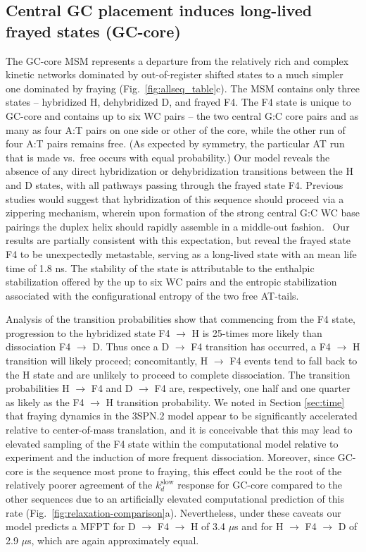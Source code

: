 \documentclass[journal=jpcbfk,manuscript=article]{achemso}
\begin{document}
\subsection{Central GC placement induces long-lived frayed states (GC-core)} \label{sec:GC-core}

The GC-core MSM represents a departure from the relatively rich and complex kinetic networks dominated by out-of-register shifted states to a much simpler one dominated by fraying (Fig.~\ref{fig:allseq_table}c). The MSM contains only three states -- hybridized H, dehybridized D, and frayed F4. The F4 state is unique to GC-core and contains up to six WC pairs -- the two central G:C core pairs and as many as four A:T pairs on one side or other of the core, while the other run of four A:T pairs remains free. (As expected by symmetry, the particular AT run that is made vs.\ free occurs with equal probability.) Our model reveals the absence of any direct hybridization or dehybridization transitions between the H and D states, with all pathways passing through the frayed state F4. Previous studies would suggest that hybridization of this sequence should proceed via a zippering mechanism, wherein upon formation of the strong central G:C WC base pairings the duplex helix should rapidly assemble in a middle-out fashion.~\citep{Romano2013DNADependence, Yin2011KineticsHybridization} Our results are partially consistent with this expectation, but reveal the frayed state F4 to be unexpectedly metastable, serving as a long-lived state with an mean life time of 1.8 ns. The stability of the state is attributable to the enthalpic stabilization offered by the up to six WC pairs and the entropic stabilization associated with the configurational entropy of the two free AT-tails.

Analysis of the transition probabilities show that commencing from the F4 state, progression to the hybridized state F4 $\rightarrow$ H is 25-times more likely than dissociation F4 $\rightarrow$ D. Thus once a D $\rightarrow$ F4 transition has occurred, a F4 $\rightarrow$ H transition will likely proceed; concomitantly, H $\rightarrow$ F4 events tend to fall back to the H state and are unlikely to proceed to complete dissociation. The transition probabilities H $\rightarrow$ F4 and D $\rightarrow$ F4 are, respectively, one half and one quarter as likely as the F4 $\rightarrow$ H transition probability. We noted in Section \ref{sec:time} that fraying dynamics in the 3SPN.2 model appear to be significantly accelerated relative to center-of-mass translation, and it is conceivable that this may lead to elevated sampling of the F4 state within the computational model relative to experiment and the induction of more frequent dissociation. Moreover, since GC-core is the sequence most prone to fraying, this effect could be the root of the relatively poorer agreement of the $k_d^\mathrm{slow}$ response for GC-core compared to the other sequences due to an artificially elevated computational prediction of this rate (Fig.~\ref{fig:relaxation-comparison}a). Nevertheless, under these caveats our model predicts a MFPT for D $\rightarrow$ F4 $\rightarrow$ H of 3.4 $\mu$s and for H $\rightarrow$ F4 $\rightarrow$ D of 2.9 $\mu$s, which are again approximately equal.
\end{document}
